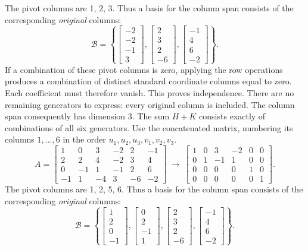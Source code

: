 The pivot columns are 1, 2, 3. Thus a basis for the column span consists of the corresponding \emph{original} columns:
\[\mathcal B=\left\{\left[\begin{array}{r}-2\\-2\\-1\\3\end{array}\right],\left[\begin{array}{r}2\\3\\2\\-6\end{array}\right],\left[\begin{array}{r}-1\\4\\6\\-2\end{array}\right]\right\}.\]
If a combination of these pivot columns is zero, applying the row operations produces a combination of distinct standard coordinate columns equal to zero. Each coefficient must therefore vanish. This proves independence. There are no remaining generators to express: every original column is included. The column span consequently has dimension $3$.
The sum $H+K$ consists exactly of combinations of all six generators. Use the concatenated matrix, numbering its columns $1,\ldots,6$ in the order $u_1,u_2,u_3,v_1,v_2,v_3$.
\[A=\left[\begin{array}{rrrrrr}1&0&3&-2&2&-1\\2&2&4&-2&3&4\\0&-1&1&-1&2&6\\-1&1&-4&3&-6&-2\end{array}\right]\ \longrightarrow\ \left[\begin{array}{rrrrrr}1&0&3&-2&0&0\\0&1&-1&1&0&0\\0&0&0&0&1&0\\0&0&0&0&0&1\end{array}\right].\]
The pivot columns are 1, 2, 5, 6. Thus a basis for the column span consists of the corresponding \emph{original} columns:
\[\mathcal B=\left\{\left[\begin{array}{r}1\\2\\0\\-1\end{array}\right],\left[\begin{array}{r}0\\2\\-1\\1\end{array}\right],\left[\begin{array}{r}2\\3\\2\\-6\end{array}\right],\left[\begin{array}{r}-1\\4\\6\\-2\end{array}\right]\right\}.\]

